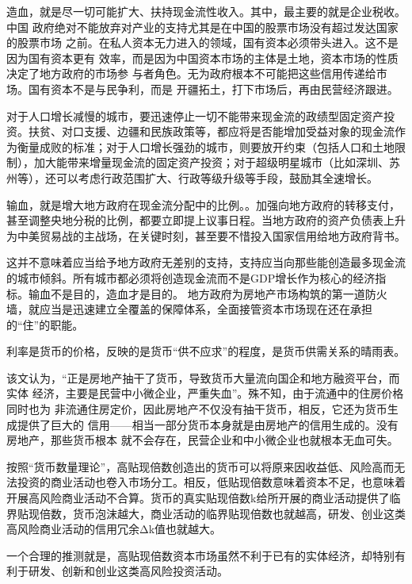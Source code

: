 造血，就是尽一切可能扩大、扶持现金流性收入。其中，最主要的就是企业税收。中国
政府绝对不能放弃对产业的支持尤其是在中国的股票市场没有超过发达国家的股票市场
之前。在私人资本无力进入的领域，国有资本必须带头进入。这不是因为国有资本更有
效率，而是因为中国资本市场的主体是土地，资本市场的性质决定了地方政府的市场参
与者角色。无为政府根本不可能把这些信用传递给市场。国有资本不是与民争利，而是
开疆拓土，打下市场后，再由民营经济跟进。

对于人口增长减慢的城市，要迅速停止一切不能带来现金流的政绩型固定资产投资。扶贫、对口支援、边疆和民族政策等，都应将是否能增加受益对象的现金流作为衡量成败的标准；对于人口增长强劲的城市，则要放开约束（包括人口和土地限制），加大能带来增量现金流的固定资产投资；对于超级明星城市（比如深圳、苏州等），还可以考虑行政范围扩大、行政等级升级等手段，鼓励其全速增长。

输血，就是增大地方政府在现金流分配中的比例。。加强向地方政府的转移支付，甚至调整央地分税的比例，都要立即提上议事日程。当地方政府的资产负债表上升为中美贸易战的主战场，在关键时刻，甚至要不惜投入国家信用给地方政府背书。

这并不意味着应当给予地方政府无差别的支持，支持应当向那些能创造最多现金流的城市倾斜。所有城市都必须将创造现金流而不是GDP增长作为核心的经济指标。输血不是目的，造血才是目的。
地方政府为房地产市场构筑的第一道防火墙，就应当是迅速建立全覆盖的保障体系，全面接管资本市场现在还在承担的“住”的职能。

利率是货币的价格，反映的是货币“供不应求”的程度，是货币供需关系的晴雨表。

该文认为，“正是房地产抽干了货币，导致货币大量流向国企和地方融资平台，而实体
经济，主要是民营中小微企业，严重失血”。殊不知，由于流通中的住房价格同时也为
非流通住房定价，因此房地产不仅没有抽干货币，相反，它还为货币生成提供了巨大的
信用——相当一部分货币本身就是由房地产的信用生成的。没有房地产，那些货币根本
就不会存在，民营企业和中小微企业也就根本无血可失。

按照“货币数量理论”，高贴现倍数创造出的货币可以将原来因收益低、风险高而无法投资的商业活动也卷入市场分工。相反，低贴现倍数意味着资本不足，也意味着开展高风险商业活动不合算。货币的真实贴现倍数k给所开展的商业活动提供了临界贴现倍数，货币泡沫越大，商业活动的临界贴现倍数也就越高，研发、创业这类高风险商业活动的信用冗余Δk值也就越大。

一个合理的推测就是，高贴现倍数资本市场虽然不利于已有的实体经济，却特别有利于研发、创新和创业这类高风险投资活动。

